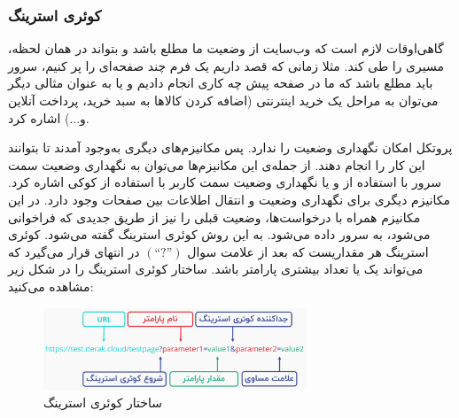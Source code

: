 \subsubsection{کوئری استرینگ}

‏گاهی‌اوقات لازم است که وب‌سایت از وضعیت
\noindent\unskip{}
ما مطلع باشد و بتواند در همان لحظه، مسیری را طی کند. مثلا زمانی که قصد داریم یک فرم چند صفحه‌ای را پر کنیم، سرور باید مطلع باشد که ما در صفحه پیش چه کاری انجام دادیم و یا به عنوان مثالی دیگر می‌توان به مراحل یک خرید اینترنتی (اضافه کردن کالاها به سبد خرید، پرداخت آنلاین و...) اشاره کرد.

پروتکل
امکان نگهداری وضعیت را ندارد. پس مکانیزم‌های دیگری به‌وجود آمدند تا بتوانند این کار را انجام دهند. از جمله‌ی این مکانیزم‌ها می‌توان به نگهداری وضعیت سمت سرور با استفاده از 
و یا نگهداری وضعیت سمت کاربر
\noindent\unskip{}
با استفاده از کوکی
\noindent\unskip{}
اشاره کرد.
مکانیزم دیگری برای نگهداری وضعیت و انتقال اطلاعات بين صفحات وجود دارد. در این مکانیزم همراه با درخواست‌ها، وضعیت قبلی را نیز از طریق
جدیدی که فراخوانی می‌شود، به سرور داده می‌شود. به این روش کوئری استرینگ گفته می‌شود.
کوئری استرینگ هر مقداریست که بعد از علامت سوال $(“?”)$ در انتهای
قرار می‌گیرد که می‌تواند یک یا تعداد بیشتری پارامتر باشد.
\noindent
ساختار کوئری استرینگ را در شکل زیر مشاهده می‌کنید:

\begin{figure}[h]
	\centering
	\includegraphics[width=0.7\textwidth]{./images/Chapter3/QueryStringStructure}	
	\caption[ساختار کوئری استرینگ]{ساختار کوئری استرینگ \cite{QueryString}}
	\label{ساختار کوئری}
\end{figure}
\noindent
\unskip

